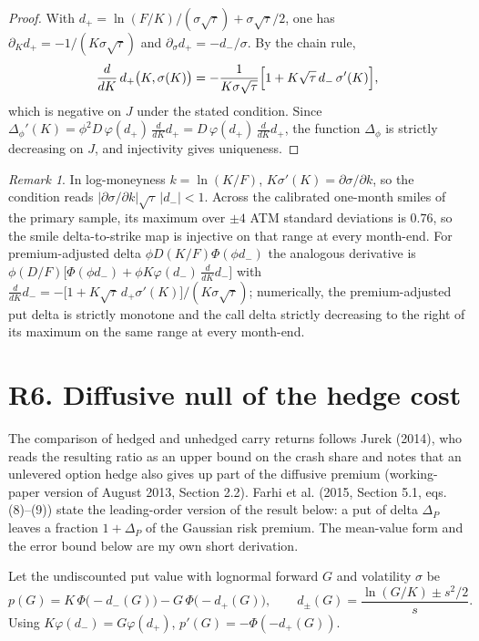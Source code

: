 \documentclass[11pt]{article}
\theoremstyle{remark}
\newtheorem{remark}[proposition]{Remark}
\begin{document}
\begin{proof}
With $d_+=\ln(F/K)/(\sigma\sqrt\tau)+\sigma\sqrt\tau/2$, one has $\partial_Kd_+=-1/(K\sigma\sqrt\tau)$ and $\partial_\sigma d_+=-d_-/\sigma$. By the chain rule,
\[
\frac{d}{dK}\,d_+\bigl(K,\sigma(K)\bigr)=-\frac{1}{K\sigma\sqrt\tau}\Bigl[1+K\sqrt\tau\,d_-\,\sigma'(K)\Bigr],
\]
which is negative on $J$ under the stated condition. Since $\Delta_\phi'(K)=\phi^2D\,\varphi(d_+)\,\frac{d}{dK}d_+=D\,\varphi(d_+)\,\frac{d}{dK}d_+$, the function $\Delta_\phi$ is strictly decreasing on $J$, and injectivity gives uniqueness.
\end{proof}

\begin{remark}
In log-moneyness $k=\ln(K/F)$, $K\sigma'(K)=\partial\sigma/\partial k$, so the condition reads $|\partial\sigma/\partial k|\sqrt\tau\,|d_-|<1$. Across the calibrated one-month smiles of the primary sample, its maximum over $\pm4$ ATM standard deviations is $0.76$, so the smile delta-to-strike map is injective on that range at every month-end. For premium-adjusted delta $\phi D(K/F)\Phi(\phi d_-)$ the analogous derivative is $\phi(D/F)\bigl[\Phi(\phi d_-)+\phi K\varphi(d_-)\,\tfrac{d}{dK}d_-\bigr]$ with $\tfrac{d}{dK}d_-=-\bigl[1+K\sqrt\tau\,d_+\sigma'(K)\bigr]/(K\sigma\sqrt\tau)$; numerically, the premium-adjusted put delta is strictly monotone and the call delta strictly decreasing to the right of its maximum on the same range at every month-end.
\end{remark}

\section*{R6. Diffusive null of the hedge cost}

The comparison of hedged and unhedged carry returns follows Jurek (2014), who reads the resulting ratio as an upper bound on the crash share and notes that an unlevered option hedge also gives up part of the diffusive premium (working-paper version of August 2013, Section 2.2). Farhi et al. (2015, Section 5.1, eqs. (8)--(9)) state the leading-order version of the result below: a put of delta $\Delta_P$ leaves a fraction $1+\Delta_P$ of the Gaussian risk premium. The mean-value form and the error bound below are my own short derivation.

Let the undiscounted put value with lognormal forward $G$ and volatility $\sigma$ be
\[
p(G)=K\,\Phi\bigl(-d_-(G)\bigr)-G\,\Phi\bigl(-d_+(G)\bigr),\qquad d_\pm(G)=\frac{\ln(G/K)\pm s^2/2}{s}.
\]
Using $K\varphi(d_-)=G\varphi(d_+)$, $p'(G)=-\Phi(-d_+(G))$.
\end{document}
